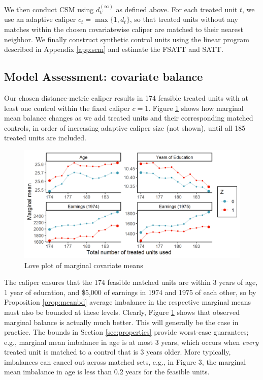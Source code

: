 \documentclass{article}
\begin{document}
We then conduct CSM using $d_V^{(\infty)}$ as defined above.
For each treated unit $t$, we use an adaptive caliper $c_t = \max \{1, d_t\}$, so that treated units without any matches within the chosen covariatewise caliper are matched to their nearest neighbor.
We finally construct synthetic control units using the linear program described in Appendix \ref{app:scm} and estimate the FSATT and SATT.

\subsection{Model Assessment: covariate balance}


Our chosen distance-metric caliper results in 174 feasible treated units with at least one control within the fixed caliper $c=1$.
Figure \ref{fig:lalonde_love} shows how marginal mean balance changes as we add treated units and their corresponding matched controls, in order of increasing adaptive caliper size (not shown), until all 185 treated units are included.
\begin{figure}[t]
    \centering
    \includegraphics[width=\textwidth]{writeup/figures/lalonde_love2.png}
    \caption{Love plot of marginal covariate means}
    \label{fig:lalonde_love}
\end{figure}

The caliper ensures that the 174 feasible matched units are within 3 years of age, 1 year of education, and \$5,000 of earnings in 1974 and 1975 of each other, so by Proposition \ref{prop:meanbd} average imbalance in the respective marginal means must also be bounded at these levels.
Clearly, Figure \ref{fig:lalonde_love} shows that observed marginal balance is actually much better.
This will generally be the case in practice.
The bounds in Section \ref{sec:properties} provide worst-case guarantees; 
e.g., marginal mean imbalance in age is at most 3 years, which occurs when \textit{every} treated unit is matched to a control that is 3 years older.
More typically, imbalances can cancel out across matched sets, e.g., in Figure 3, the marginal mean imbalance in age is less than 0.2 years for the feasible units.
\end{document}

